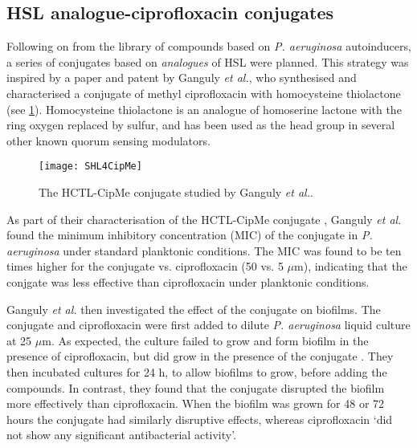 







\subsection{HSL analogue-ciprofloxacin conjugates\label{sec:AIA_intro}}

Following on from the library of compounds based on \textit{P. aeruginosa} autoinducers, a series of conjugates based on \textit{analogues} of HSL were planned. This strategy was inspired by a paper\cite{Ganguly2011} and patent\cite{Iyer2012} by Ganguly \textit{et al.}, who synthesised and characterised a conjugate  of methyl ciprofloxacin with homocysteine thiolactone (see \ref{fgr:SHL4CipMe}). Homocysteine thiolactone is an analogue of homoserine lactone with the ring oxygen replaced by sulfur, and has been used as the head group in several other known quorum sensing modulators\cite{Eberhard1986,Schaefer1996,Passador1996,Smith2003,Chhabra1993,McInnis2011,Geske2007,Janssens2007}.


\begin{figure}[H]
	\begin{center}
		\texttt{[image: SHL4CipMe]}
		\caption{The HCTL-CipMe conjugate  studied by Ganguly \textit{et al.}\cite{Ganguly2011,Iyer2012}.\label{fgr:SHL4CipMe}}
	\end{center}
\end{figure}


As part of their characterisation of the HCTL-CipMe conjugate , Ganguly \textit{et al.} found the minimum inhibitory concentration (MIC) of the conjugate in \textit{P. aeruginosa} under standard planktonic conditions. 
The MIC was found to be ten times higher for the conjugate vs. ciprofloxacin (50 vs. 5 $\mu$m), indicating that the conjgate was less effective than ciprofloxacin under planktonic conditions. 

Ganguly \textit{et al.} then investigated the effect of the conjugate on biofilms. 
The conjugate and ciprofloxacin were first added to dilute \textit{P. aeruginosa} liquid culture at 25 $\mu$m. 
As expected, the culture failed to grow and form biofilm in the presence of ciprofloxacin, but did grow in the presence of the conjugate . 
They then incubated cultures for 24 h, to allow biofilms to grow, before adding the compounds. In contrast, they found that the conjugate  disrupted the biofilm more effectively than ciprofloxacin. 
When the biofilm was grown for 48 or 72 hours the conjugate had similarly disruptive effects, whereas ciprofloxacin `did not show any significant antibacterial activity'.

